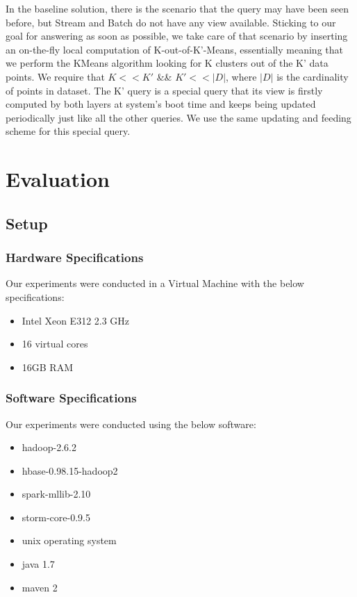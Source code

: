 \documentclass{lmproj}
\begin{document}
In the baseline solution, there is the scenario that the query may have been seen before, but Stream and Batch do not have any view available. Sticking to our goal for answering as soon as possible, we take care of that scenario by inserting an on-the-fly local computation of K-out-of-K'-Means, essentially meaning that we perform the KMeans algorithm looking for K clusters out of the K' data points. We require that $K<<K'$ \&\& $K'<<|D|$, where $|D|$ is the cardinality of points in dataset. The K' query is a special query that its view is firstly computed by both layers at system's boot time and keeps being updated periodically just like all the other queries. We use the same updating and feeding scheme for this special query.


\chapter{Evaluation}
\label{evaluation}

\section{Setup}
\label{evaluation}

\subsection{Hardware Specifications}
Our experiments were conducted in a Virtual Machine with the below specifications:
\begin{itemize}
	\item Intel Xeon E312 2.3 GHz 
	\item 16 virtual cores 
	\item 16GB RAM
\end{itemize}

\subsection{Software Specifications}
Our experiments were conducted using the below software:
\begin{itemize}
	\item hadoop-2.6.2
	\item hbase-0.98.15-hadoop2
	\item spark-mllib-2.10
	\item storm-core-0.9.5
	\item unix operating system
	\item java 1.7
	\item maven 2
\end{itemize}
\end{document}
